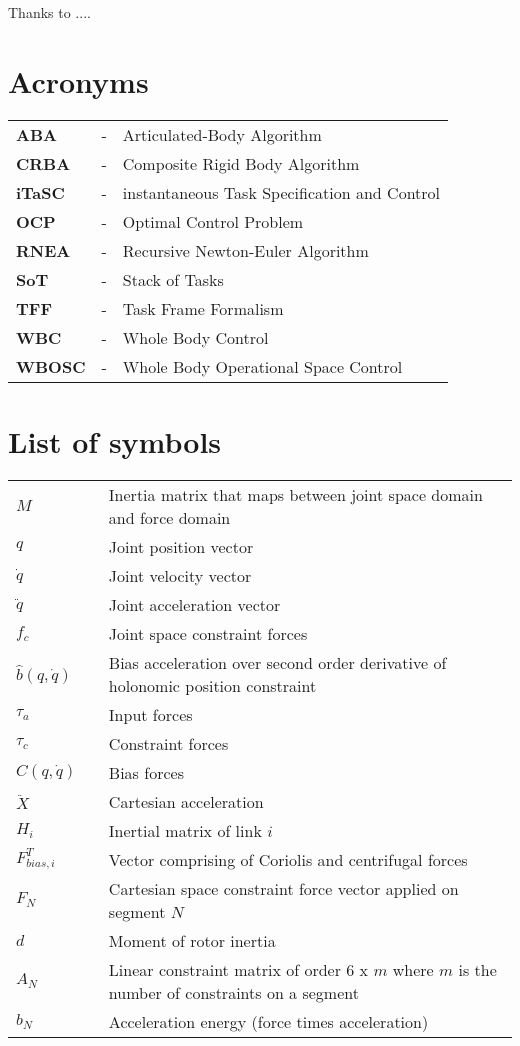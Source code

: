 \documentclass[rnd]{mas_report}
\newcommand\nomenclature[3]{#1 & #2 & #3 \\}
\begin{document}
	
	\begin{acknowledgements}
		Thanks to ....
	\end{acknowledgements}
	
	
	{\hypersetup{hidelinks}
			\tableofcontents
	}
	\listoffigures
	\listoftables

	\newpage
	\chapter*{Acronyms}
	\begin{longtable}{@{}p{2.5cm}@{}p{1cm}@{}p{\dimexpr\textwidth-1cm\relax}@{}}
		\label{aba}\nomenclature{\textbf{ABA}}{-}{Articulated-Body Algorithm }%
		\label{crba}\nomenclature{\textbf{CRBA}}{-}{Composite Rigid Body Algorithm}%
		\label{itasc}\nomenclature{\textbf{iTaSC}}{-}{instantaneous Task Specification and Control}%
		\label{ocp}\nomenclature{\textbf{OCP}}{-}{Optimal Control Problem}%
		\label{rnea}\nomenclature{\textbf{RNEA}}{-}{Recursive Newton-Euler Algorithm}%
		\label{sot}\nomenclature{\textbf{SoT}}{-}{Stack of Tasks}%
		\label{tff}\nomenclature{\textbf{TFF}}{-}{Task Frame Formalism}%
		\label{wbc}\nomenclature{\textbf{WBC}}{-}{Whole Body Control}%
		\label{wbosc}\nomenclature{\textbf{WBOSC}}{-}{Whole Body Operational Space Control}%
		
		
		
	\end{longtable}
	
	\newpage
	\chapter*{List of symbols}
	\begin{longtable}{@{}p{1.8cm}@{}p{1cm}@{}p{\dimexpr\textwidth-1cm\relax}@{}}
		\nomenclature{$M$}{}{Inertia matrix that maps between joint space domain and force domain \setstretch{1.5}} 
		\nomenclature{$q$}{}{Joint position vector}
		\nomenclature{$\dot{q}$}{}{Joint velocity vector}
		\nomenclature{$\ddot{q}$}{}{Joint acceleration vector}
		\nomenclature{$f_c$}{}{Joint space constraint forces}
		\nomenclature{$\hat{b}(q, \dot{q})$}{}{Bias acceleration over second order derivative of holonomic position constraint}
		\nomenclature{$\tau_a$}{}{Input forces}
		\nomenclature{$\tau_c$}{}{Constraint forces}
		\nomenclature{$C(q, \dot{q})$}{}{Bias forces}
		\nomenclature{$\ddot{X}$}{}{Cartesian acceleration}
		\nomenclature{$H_i$}{}{Inertial matrix of link $i$}
		\nomenclature{$F_{bias, i}^T$}{}{Vector comprising of Coriolis and centrifugal forces}
		\nomenclature{$F_N$}{}{Cartesian space constraint force vector applied on segment $N$}
		\nomenclature{$d$}{}{Moment of rotor inertia}
		\nomenclature{$A_N$}{}{Linear constraint matrix of order 6 x $m$ where $m$ is the number of constraints on a segment}
		\nomenclature{$b_N$}{}{Acceleration energy (force times acceleration)}	
	\end{longtable}
	
\end{document}
